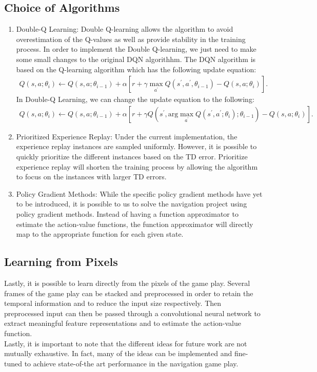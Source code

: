\documentclass[12pt,twoside]{article}
\begin{document}
\subsection{Choice of Algorithms}
\begin{enumerate}
	\item Double-Q Learning: Double Q-learning allows the algorithm to avoid overestimation of the Q-values as well as provide stability in the training process. In order to implement the Double Q-learning, we just need to make some small changes to the original DQN algorithhm. The DQN algorithm is based on the Q-learning algorithm which has the following update equation:
	\begin{align*}
		Q(s,a; \theta_i) \leftarrow Q(s,a; \theta_{i-1})  + \alpha\left[r + \gamma \max_{a^\prime} Q(s^\prime, a^\prime, \theta_{i-1})  - Q(s,a; \theta_i)\right].
	\end{align*}
	In Double-Q Learning, we can change the update equation to the following:
	\begin{align*}
		Q(s,a; \theta_i) \leftarrow Q(s,a; \theta_{i-1})  + \alpha\left[r + \gamma Q\left(s^\prime, \text{arg} \max_{a^\prime} Q(s^\prime, a^\prime; \theta_i); \theta_{i-1}\right)  - Q(s,a; \theta_i)\right].
	\end{align*}
	
	\item Prioritized Experience Replay: Under the current implementation, the experience replay instances are sampled uniformly. However, it is possible to quickly prioritize the different instances based on the TD error. Prioritize experience replay will shorten the training process by allowing the algorithm to focus on the instances with larger TD errors.

	\item Policy Gradient Methods: While the specific policy gradient methods have yet to be introduced, it is possible to us to solve the navigation project using policy gradient methods. Instead of having a function approximator to estimate the action-value functions, the function approximator will directly map to the appropriate function for each given state.
	
\end{enumerate}

\subsection{Learning from Pixels}
Lastly, it is possible to learn directly from the pixels of the game play. Several frames of the game play can be stacked and preprocessed in order to retain the temporal information and to reduce the input size respectively. Then preprocessed input can then be passed through a convolutional neural network to extract meaningful feature representations and to estimate the action-value function. \\

Lastly, it is important to note that the different ideas for future work are not mutually exhaustive. In fact, many of the ideas can be implemented and fine-tuned to achieve state-of-the art performance in the navigation game play.
\end{document}
